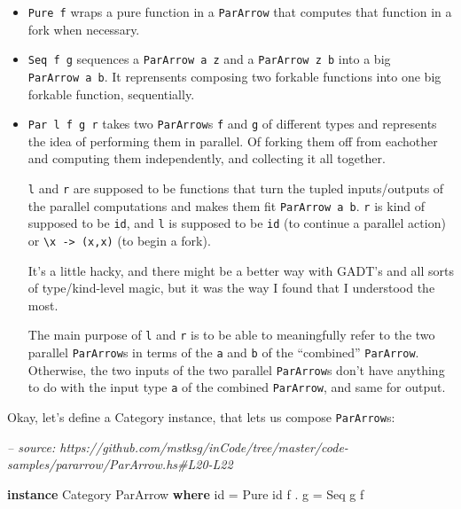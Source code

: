 \documentclass[]{article}
\newenvironment{Shaded}{}{}
\newcommand{\CommentTok}[1]{\textcolor[rgb]{0.38,0.63,0.69}{\textit{#1}}}
\newcommand{\DataTypeTok}[1]{\textcolor[rgb]{0.56,0.13,0.00}{#1}}
\newcommand{\FunctionTok}[1]{\textcolor[rgb]{0.02,0.16,0.49}{#1}}
\newcommand{\KeywordTok}[1]{\textcolor[rgb]{0.00,0.44,0.13}{\textbf{#1}}}
\newcommand{\NormalTok}[1]{#1}
\begin{document}
\begin{itemize}
\item
  \texttt{Pure\ f} wraps a pure function in a \texttt{ParArrow} that computes
  that function in a fork when necessary.
\item
  \texttt{Seq\ f\ g} sequences a \texttt{ParArrow\ a\ z} and a
  \texttt{ParArrow\ z\ b} into a big \texttt{ParArrow\ a\ b}. It reprensents
  composing two forkable functions into one big forkable function, sequentially.
\item
  \texttt{Par\ l\ f\ g\ r} takes two \texttt{ParArrow}s \texttt{f} and
  \texttt{g} of different types and represents the idea of performing them in
  parallel. Of forking them off from eachother and computing them independently,
  and collecting it all together.

  \texttt{l} and \texttt{r} are supposed to be functions that turn the tupled
  inputs/outputs of the parallel computations and makes them fit
  \texttt{ParArrow\ a\ b}. \texttt{r} is kind of supposed to be \texttt{id}, and
  \texttt{l} is supposed to be \texttt{id} (to continue a parallel action) or
  \texttt{\textbackslash{}x\ -\textgreater{}\ (x,x)} (to begin a fork).

  It's a little hacky, and there might be a better way with GADT's and all sorts
  of type/kind-level magic, but it was the way I found that I understood the
  most.

  The main purpose of \texttt{l} and \texttt{r} is to be able to meaningfully
  refer to the two parallel \texttt{ParArrow}s in terms of the \texttt{a} and
  \texttt{b} of the ``combined'' \texttt{ParArrow}. Otherwise, the two inputs of
  the two parallel \texttt{ParArrow}s don't have anything to do with the input
  type \texttt{a} of the combined \texttt{ParArrow}, and same for output.
\end{itemize}

Okay, let's define a Category instance, that lets us compose \texttt{ParArrow}s:

\begin{Shaded}
\begin{Highlighting}[]
\CommentTok{-- source: https://github.com/mstksg/inCode/tree/master/code-samples/pararrow/ParArrow.hs#L20-L22}

\KeywordTok{instance} \DataTypeTok{Category} \DataTypeTok{ParArrow} \KeywordTok{where}
\NormalTok{    id    }\FunctionTok{=} \DataTypeTok{Pure}\NormalTok{ id}
\NormalTok{    f }\FunctionTok{.}\NormalTok{ g }\FunctionTok{=} \DataTypeTok{Seq}\NormalTok{ g f}
\end{Highlighting}
\end{Shaded}
\end{document}
